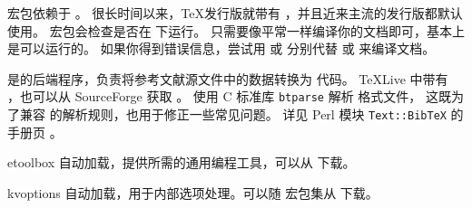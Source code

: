 \begin{marglist}

\item[\eTeX]
\biblatex 宏包依赖于 \eTeX 。
很长时间以来，\TeX 发行版就带有 \eTeX ，并且近来主流的发行版都默认使用。
\biblatex 宏包会检查是否在 \eTeX 下运行。
只需要像平常一样编译你的文档即可，基本上是可以运行的。
如果你得到错误信息，尝试用  或  分别代替  或  来编译文档。

\item[\biber]
\biber 是\biblatex 的后端程序，负责将参考文献源文件中的数据转换为 \latex 代码。
\TeX Live 中带有 \biber ，也可以从 SourceForge 获取  。
\biber 使用 C 标准库 \texttt{btparse} 解析 \BibTeX 格式文件，
这既为了兼容 \BibTeX 的解析规则，也用于修正一些常见问题。
详见 Perl 模块 \texttt{Text::BibTeX} 的手册页 。

\item[etoolbox]
自动加载，提供\biblatex 所需的通用编程工具，可以从  下载。

\item[kvoptions]
自动加载，用于内部选项处理。可以随  宏包集从  下载。


\end{marglist}
